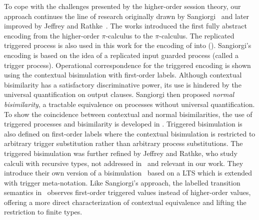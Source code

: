 To cope with the challenges presented by the higher-order
session theory, 
our approach continues the line of research 
originally drawn by Sangiorgi~\cite{San96H,SangiorgiD:expmpa}
and later improved by Jeffrey and Rathke~\cite{DBLP:journals/lmcs/JeffreyR05}.
The works %
\cite{San96H,SangiorgiD:expmpa}
introduced the first fully abstract encoding from the higher-order 
$\pi$-calculus to the $\pi$-calculus. 
The replicated triggered process 
is also used in this work for the encoding of \HOp into \sessp ().
Sangiorgi's encoding is based on the idea of a replicated input guarded process 
(called a trigger process). Operational correspondence for
the triggered encoding is shown using the contextual bisimulation
with first-order labels.
Although contextual bisimilarity has a satisfactory discriminative power,
its use is hindered by the universal quantification on output clauses.
Sangiorgi then proposed \emph{normal bisimilarity}, a tractable  equivalence 
on processes without universal quantification. 
To show the coincidence between contextual and normal bisimilarities, 
the use of triggered processes and bisimilarity is developed in \cite{San96H}.
Triggered bisimulation is also defined on first-order labels
where the contextual bisimulation is restricted to arbitrary
trigger substitution rather than arbitrary process substitutions.
The triggered bisimulation was further refined by Jeffrey and
Rathke, who study calculi with recursive types, not addressed in~\cite{San96H,SangiorgiD:expmpa} and
relevant in our work.
They introduce their own version of a
bisimulation~\cite{DBLP:journals/lmcs/JeffreyR05}
based on a LTS which is extended with trigger meta-notation.
Like Sangiorgi's approach, the labelled transition semantics
in~\cite{DBLP:journals/lmcs/JeffreyR05}
observes first-order triggered values instead of
higher-order values, offering a more direct characterization of contextual equivalence
and lifting the restriction to finite types.


